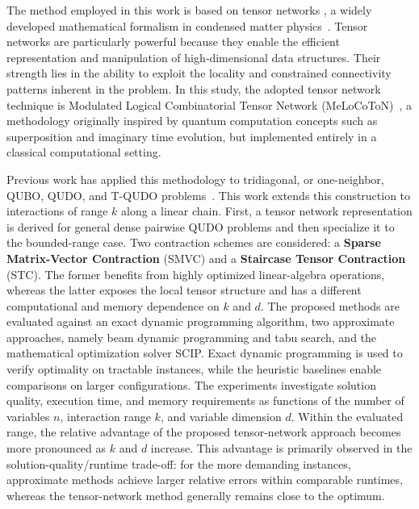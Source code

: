 \documentclass[%
 reprint,
 amsmath,amssymb,
 aps,
 pra,showkeys,
]{revtex4-2}
\begin{document}
The method employed in this work is based on tensor networks \cite{tensornetworksnutshell,lecturesquantumtensornetworks,Orus_TN}, a widely developed mathematical formalism in condensed matter physics~\cite{Orus_Many_body}. Tensor networks are particularly powerful because they enable the efficient representation and manipulation of high‑dimensional data structures. Their strength lies in the ability to exploit the locality and constrained connectivity patterns inherent in the problem. In this study, the adopted tensor network technique is Modulated Logical Combinatorial Tensor Network (MeLoCoToN)~\cite{melocoton}, a methodology originally inspired by quantum computation concepts such as superposition and imaginary time evolution, but implemented entirely in a classical computational setting.

Previous work has applied this methodology to
tridiagonal, or one-neighbor, QUBO, QUDO, and T-QUDO
problems~\cite{QUBO_tridiaonal}. This work extends this construction to interactions of range $k$
along a linear chain. First, a tensor network representation is derived
for general dense pairwise QUDO problems and then specialize it to the
bounded-range case. Two contraction schemes are considered: a
\textbf{Sparse Matrix-Vector Contraction} (SMVC) and a \textbf{Staircase Tensor Contraction} (STC). The former benefits from highly optimized
linear-algebra operations, whereas the latter exposes the local tensor
structure and has a different computational and memory dependence on
$k$ and $d$. 
The proposed methods are evaluated against an exact dynamic programming algorithm, two approximate approaches, namely beam dynamic programming and tabu search, and the mathematical optimization solver SCIP. Exact
dynamic programming is used to verify optimality on tractable
instances, while the heuristic baselines enable comparisons on larger
configurations. The experiments investigate solution quality, execution
time, and memory requirements as functions of the number of variables
$n$, interaction range $k$, and variable dimension $d$. Within the evaluated range, the relative advantage of the proposed tensor-network approach becomes more pronounced as $k$ and $d$ increase. This advantage is primarily observed in the solution-quality/runtime trade-off: for the more demanding instances, approximate methods achieve larger relative errors within comparable runtimes, whereas the tensor-network method generally remains close to the optimum.
\end{document}
